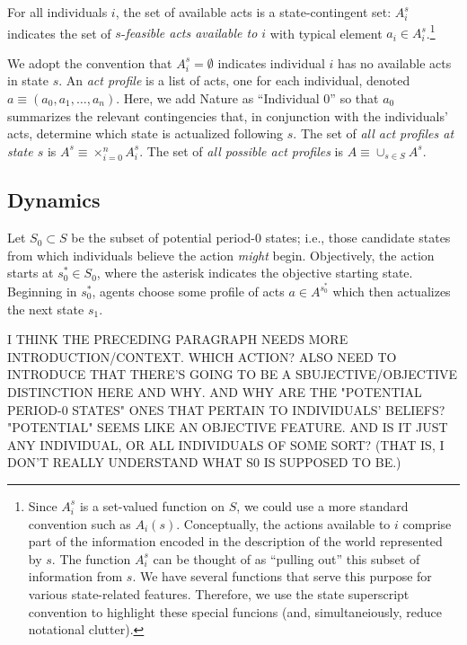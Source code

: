 \documentclass[
11pt,
titlepage,
reqno,
]{article}%
\theoremstyle{definition}
\begin{document}
	For all individuals $i$,  the set of available acts is a state-contingent set: $A_i^s$ indicates the set of $s$-\textit{feasible acts available to $i$} with typical element $a_i\in A_i^s$.\footnote
	{
		Since $A_i^s$ is a set-valued function on $S$, we could use a more standard convention such as $A_i(s)$.  
		Conceptually, the actions available to $i$ comprise part of the information encoded in the description of the world represented by $s$. 
		The function $A_i^s$ can be thought of as ``pulling out'' this subset of information from $s$. We have several functions that serve this purpose for various state-related features. 
		Therefore, we use the state superscript convention to highlight these special funcions (and, simultaneiously, reduce notational clutter).
	} 
	
	We adopt the convention that $A_i^s=\emptyset$ indicates individual $i$ has no available acts in state $s$.
	An \textit{act profile} is a list of acts, one for each individual, denoted  $a\equiv(a_0,a_1,\ldots,a_n)$. 
	Here, we add Nature as ``Individual 0'' so that $a_0$ summarizes the relevant contingencies that, in conjunction with the individuals' acts, determine which state is actualized following $s$. 
	The set of \textit{all act profiles at state $s$} is $A^s\equiv \times_{i=0}^n A_i^s$. The set of \textit{all possible act profiles} is $A\equiv \cup_{s\in S} A^s$.
	
	\subsection{Dynamics  } 
	Let $S_0\subset S$ be the subset of potential period-0 states; i.e., those candidate states from which individuals believe the action \textit{might} begin. 
	Objectively, the action starts at  $s_0^\ast\in S_0$, where the asterisk indicates the objective starting state.  
	Beginning in $s_0^\ast$, agents choose some profile of acts $a\in A^{s_0^\ast}$ which then actualizes the next state $s_1$. 
	
	I THINK THE PRECEDING PARAGRAPH NEEDS MORE INTRODUCTION/CONTEXT. WHICH ACTION? ALSO NEED TO INTRODUCE THAT THERE'S GOING TO BE A SBUJECTIVE/OBJECTIVE DISTINCTION HERE AND WHY. AND WHY ARE THE "POTENTIAL PERIOD-0 STATES" ONES THAT PERTAIN TO INDIVIDUALS' BELIEFS? "POTENTIAL" SEEMS LIKE AN OBJECTIVE FEATURE. AND IS IT JUST ANY INDIVIDUAL, OR ALL INDIVIDUALS OF SOME SORT? (THAT IS, I DON'T REALLY UNDERSTAND WHAT S0 IS SUPPOSED TO BE.)
	
\end{document}
